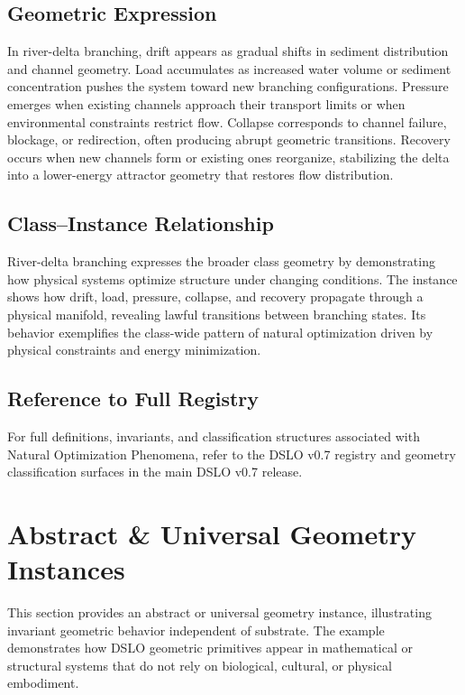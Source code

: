 \subsection{Geometric Expression}
In river-delta branching, drift appears as gradual shifts in sediment distribution and channel geometry. 
Load accumulates as increased water volume or sediment concentration pushes the system toward new 
branching configurations. Pressure emerges when existing channels approach their transport limits or 
when environmental constraints restrict flow. Collapse corresponds to channel failure, blockage, or 
redirection, often producing abrupt geometric transitions. Recovery occurs when new channels form or 
existing ones reorganize, stabilizing the delta into a lower-energy attractor geometry that restores 
flow distribution.

\subsection{Class--Instance Relationship}
River-delta branching expresses the broader class geometry by demonstrating how physical systems 
optimize structure under changing conditions. The instance shows how drift, load, pressure, collapse, 
and recovery propagate through a physical manifold, revealing lawful transitions between branching 
states. Its behavior exemplifies the class-wide pattern of natural optimization driven by physical 
constraints and energy minimization.

\subsection{Reference to Full Registry}
For full definitions, invariants, and classification structures associated with Natural Optimization 
Phenomena, refer to the DSLO v0.7 registry and geometry classification surfaces in the main DSLO v0.7 
release.

\section{Abstract \& Universal Geometry Instances}
\label{sec:abstract-universal}

This section provides an abstract or universal geometry instance, illustrating invariant geometric 
behavior independent of substrate. The example demonstrates how DSLO geometric primitives appear in 
mathematical or structural systems that do not rely on biological, cultural, or physical embodiment.

